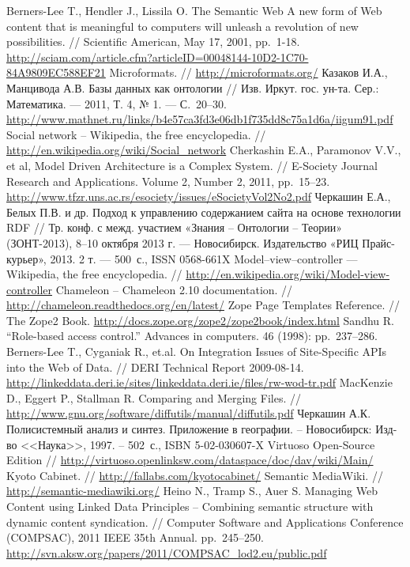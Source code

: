 \documentclass[utf8]{../IncArticle}
\begin{document}
\begin{thebibliography}{11}
 Berners-Lee T., Hendler J., Lissila O. The
  Semantic Web A new form of Web content that is meaningful to
  computers will unleash a revolution of new possibilities. //
  Scientific American, May 17, 2001,
  pp.~1-18. \url{http://sciam.com/article.cfm?articleID=00048144-10D2-1C70-84A9809EC588EF21}
 Microformats. // \url{http://microformats.org/}
 Казаков И.А., Манцивода А.В. Базы данных как
  онтологии // Изв. Иркут. гос. ун-та. Сер.: Математика. --- 2011,
  Т. 4, № 1. --- С.~20--30. \url{http://www.mathnet.ru/links/b4e57ca3fd3e06db1f735dd8c75a1d6a/iigum91.pdf}
 Social network -- Wikipedia, the free encyclopedia. //
  \url{http://en.wikipedia.org/wiki/Social_network}
 Cherkashin E.A., Paramonov V.V., et al, Model Driven
  Architecture is a Complex System. // E-Society Journal Research and
  Applications. Volume 2, Number 2, 2011, pp.~15--23.
  \url{http://www.tfzr.uns.ac.rs/esociety/issues/eSocietyVol2No2.pdf}
 Черкашин Е.А., Белых П.В. и др. Подход к управлению
  содержанием сайта на основе технологии RDF // Тр. конф. с
  межд. участием «Знания – Онтологии – Теории» (ЗОНТ-2013), 8--10
  октября 2013 г. --- Новосибирск. Издательство «РИЦ Прайс-курьер»,
  2013. 2 т. --- 500~с., ISSN 0568-661X
 Model–view–controller --- Wikipedia, the free
  encyclopedia. //
  \url{http://en.wikipedia.org/wiki/Model-view-controller}
 Chameleon -- Chameleon 2.10 documentation. //
  \url{http://chameleon.readthedocs.org/en/latest/}
 Zope Page Templates Reference. // The Zope2 Book. \url{http://docs.zope.org/zope2/zope2book/index.html}
 Sandhu R. ``Role-based access control.'' Advances in
  computers. 46 (1998): pp.~237--286.
 Berners-Lee T., Cyganiak R., et.al. On Integration
  Issues of Site-Specific APIs into the Web of Data. // DERI Technical
  Report
  2009-08-14. \url{http://linkeddata.deri.ie/sites/linkeddata.deri.ie/files/rw-wod-tr.pdf}
 MacKenzie D., Eggert P., Stallman R. Comparing and
  Merging Files. //
  \url{http://www.gnu.org/software/diffutils/manual/diffutils.pdf}
 Черкашин А.К. Полисистемный анализ и
  синтез. Приложение в географии. -- Новосибирск: Изд-во <<Наука>>,
  1997. -- 502~с., ISBN 5-02-030607-X
 Virtuoso Open-Source Edition //
  \url{http://virtuoso.openlinksw.com/dataspace/doc/dav/wiki/Main/}
 Kyoto Cabinet. // \url{http://fallabs.com/kyotocabinet/}
 Semantic MediaWiki. // \url{http://semantic-mediawiki.org/}
 Heino N., Tramp S., Auer S. Managing Web
  Content using Linked Data Principles – Combining semantic structure
  with dynamic content syndication. // Computer Software and
  Applications Conference (COMPSAC), 2011 IEEE 35th
  Annual. pp.~245--250. \url{http://svn.aksw.org/papers/2011/COMPSAC_lod2.eu/public.pdf}


\end{thebibliography}
\end{document}
